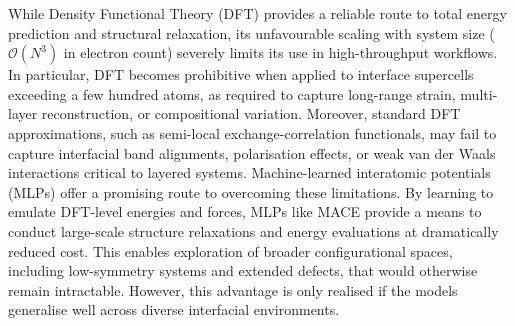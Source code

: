 While Density Functional Theory (DFT) provides a reliable route to total energy prediction and structural relaxation, its unfavourable scaling with system size ($\mathcal{O}(N^3)$ in electron count) severely limits its use in high-throughput workflows. In particular, DFT becomes prohibitive when applied to interface supercells exceeding a few hundred atoms, as required to capture long-range strain, multi-layer reconstruction, or compositional variation. Moreover, standard DFT approximations, such as semi-local exchange-correlation functionals, may fail to capture interfacial band alignments, polarisation effects, or weak van der Waals interactions critical to layered systems.
Machine-learned interatomic potentials (MLPs) offer a promising route to overcoming these limitations. By learning to emulate DFT-level energies and forces, MLPs like MACE provide a means to conduct large-scale structure relaxations and energy evaluations at dramatically reduced cost. This enables exploration of broader configurational spaces, including low-symmetry systems and extended defects, that would otherwise remain intractable. However, this advantage is only realised if the models generalise well across diverse interfacial environments.

